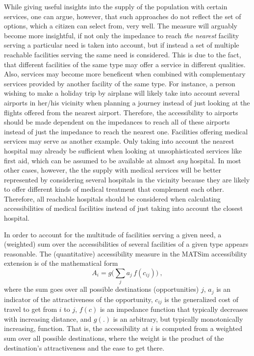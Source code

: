 While giving useful insights into the supply of the population with certain services, one can argue, however, that such approaches do not reflect the set of options, which a citizen can select from, very well. The measure will
arguably become more insightful, if not only the impedance to reach \textit{the nearest} facility serving a particular need is taken into account, but if instead a set of multiple reachable facilities serving the same need is considered. This is due to the fact, that different facilities of the same type may offer a  service in different qualities. Also, services may become more beneficent when combined with complementary services provided by another facility of the same type. For instance, a person wishing to make a holiday trip by airplane will likely take into account several airports in her/his vicinity when planning a journey instead of just looking at the flights offered from the nearest airport. Therefore, the accessibility to airports should be made dependent on the impedances to reach all of these airports instead of just the impedance to reach the nearest one. Facilities offering medical services may serve as another example. Only taking into account the nearest hospital may already be sufficient when looking at unsophisticated services like first aid, which can be assumed to be available at almost \textit{any} hospital. In most other cases, however, the the supply with medical services will be better represented by considering several hospitals in the vicinity because they are likely to offer different kinds of medical treatment that complement each other. Therefore, all reachable hospitals should be considered when calculating accessibilities of medical facilities instead of just taking into account the closest hospital.

In order to account for the multitude of facilities serving a given need, a (weighted) sum over the accessibilities of several facilities of a given type appears reasonable. The (quantitative) accessibility measure in the MATSim accessibility extension is of the mathematical form
\begin{equation}
A_i = g\Big( \sum_j a_j \, f(c_{ij}) \Big) \ ,
\label{eq:accessibility:basic}
\end{equation}
where the sum goes over all possible destinations (opportunities) $j$, $a_j$ is an indicator of the attractiveness of the opportunity, $c_{ij}$ is the generalized cost of travel to get from $i$ to $j$, $f(c)$ is an impedance function that typically decreases with increasing distance, and $g(.)$ is an arbitrary, but typically monotonically increasing, function.  That is, the accessibility at $i$ is computed from a weighted sum over all possible destinations, where the weight is the product of the destination's attractiveness and the ease to get there.

